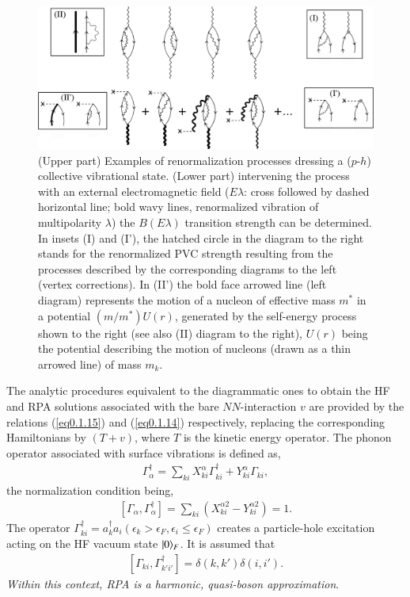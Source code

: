 \begin{figure}
	\centerline {
		\includegraphics*[width=15cm]{introduccion/figs/figpreface9}
	}
	\caption{  (Upper part) Examples of renormalization processes dressing a ($p$-$h$) collective vibrational state. (Lower part) intervening the process with an external electromagnetic field ($E\lambda$: cross followed by dashed horizontal line; bold wavy lines, renormalized vibration of multipolarity $\lambda$) the $B(E\lambda)$ transition strength can be determined. In insets (I) and (I'), the hatched circle in the diagram to the right stands for the renormalized PVC strength resulting from the processes described by the corresponding diagrams to the left (vertex corrections). In  (II') the bold face arrowed line  (left diagram) represents  the motion of a nucleon of effective mass $m^*$ in a potential $(m/m^*)U(r)$, generated by the self-energy process shown to the right (see also (II)  diagram to the right), $U(r)$  being the potential describing the motion of nucleons (drawn as a thin  arrowed line) of mass $m_k$.}
	\label{fig1.0.9}
\end{figure}




The analytic procedures equivalent  to the diagrammatic ones to obtain the HF  and RPA solutions associated with the bare $NN$-interaction $v$ are provided by the relations (\ref{eq0.1.15}) and (\ref{eq0.1.14}) respectively, replacing the corresponding Hamiltonians by $(T+v)$, where $T$ is the kinetic energy operator. The phonon operator associated with surface vibrations  is defined as,
\begin{align}\label{eq1.0.26}
\Gamma_\alpha^\dagger=\sum_{ki}X_{ki}^\alpha\Gamma_{ki}^\dagger+Y_{ki}^\alpha\Gamma_{ki},
\end{align}
 the normalization condition being, 
\begin{align}\label{eq1.0.27}
\left[\Gamma_\alpha,\Gamma_\alpha^\dagger\right]=\sum_{ki}\left(X_{ki}^{\alpha2}-Y_{ki}^{\alpha2}\right)=1.
\end{align}
The operator $\Gamma^\dagger_{ki}=a^\dagger_{k}a_{i} (\epsilon_k>\epsilon_F,\epsilon_i\leq\epsilon_F)$ creates a particle-hole excitation acting on the HF vacuum state $|{0} \rangle_F$. It is assumed that
\begin{align}\label{eq1.0.28}
\left[\Gamma_{ki},\Gamma_{k'i'}^\dagger\right]=\delta(k,k')\delta(i,i').
\end{align}
\textit{Within this context, RPA is a harmonic, quasi-boson approximation}.




